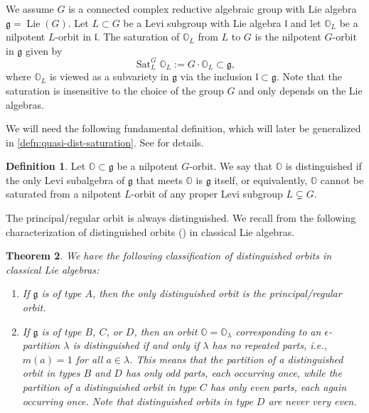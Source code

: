 \documentclass[11pt, a4paper]{amsart}
\newcommand{\g}{\mathfrak{g}}
\newcommand{\orb}{\mathbb{O}}
\newcommand{\fg}{\mathfrak{g}}
\newcommand{\fl}{\mathfrak{l}}
\DeclareMathOperator{\Lie}{Lie}
\DeclareMathOperator{\Sat}{Sat}
\newtheorem{Thm}{Theorem}[subsection]
\theoremstyle{definition}
\newtheorem{defi}[Thm]{Definition}
\numberwithin{equation}{section}
\begin{document}
We assume $G$ is a connected complex reductive algebraic group with Lie algebra $\g = \Lie(G)$. Let $L \subset G$ be a Levi subgroup with Lie algebra $\fl$ and let $\orb_L$ be a nilpotent $L$-orbit in $\fl$. The saturation of $\orb_L$ from $L$ to $G$ is the nilpotent $G$-orbit in $\fg$ given by
\[
   \Sat_L^G\orb_L := G \cdot \orb_L \subset \fg,
\]
where \(\orb_L\) is viewed as a subvariety in $\fg$ via the inclusion $\fl \subset \fg$. Note that the saturation is insensitive to the choice of the group $G$ and only depends on the Lie algebras.

We will need the following fundamental definition, which will later be generalized in \cref{defn:quasi-dist-saturation}. See \cite[Section 8.2]{CM} for details.

\begin{defi} \label{defn:dist_orbit}
	Let $\orb \subset \fg$ be a nilpotent $G$-orbit. We say that $\orb$ is distinguished if the only Levi subalgebra of $\g$ that meets $\orb$ is $\g$ itself, or equivalently, $\orb$ cannot be saturated from a nilpotent $L$-orbit of any proper Levi subgroup $L \subsetneq G$.
\end{defi}

The principal/regular orbit is always distinguished. We recall from \cite[Theorem 8.2.14]{CM} the following characterization of distinguished orbits () in classical Lie algebras.

\begin{Thm}\label{thm:dist_classical}
    We have the following classification of distinguished orbits in classical Lie algebras:
	\begin{enumerate}[itemindent=*, leftmargin=*]
		\item If $\g$ is of type $A$, then the only distinguished orbit is the principal/regular orbit.
		
		\item If $\g$ is of type $B$, $C$, or $D$, then an orbit $\orb = \orb_\lambda$ corresponding to an $\epsilon$-partition $\lambda$ is distinguished if and only if $\lambda$ has no repeated parts, i.e., $m(a) = 1$ for all $a \in \lambda$. This means that the partition of a distinguished orbit in types $B$ and $D$ has only odd parts, each occurring once, while the partition of a distinguished orbit in type $C$ has only even parts, each again occurring once. Note that distinguished orbits in type $D$ are never very even.
	\end{enumerate}
\end{Thm}
\end{document}
